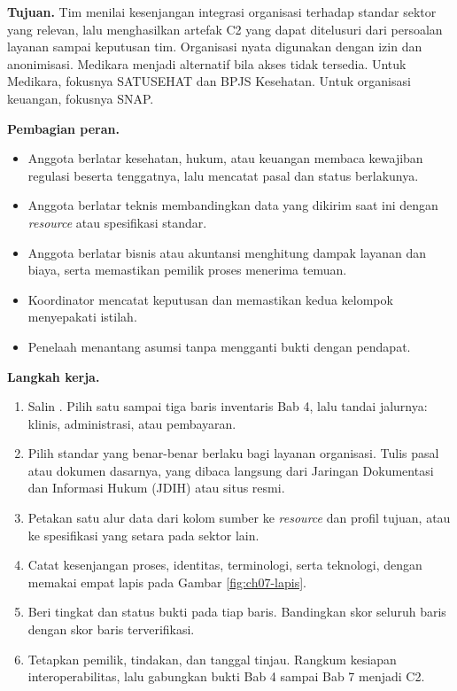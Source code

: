 \textbf{Tujuan.} Tim menilai kesenjangan integrasi organisasi terhadap standar sektor yang relevan, lalu menghasilkan
artefak C2 yang dapat ditelusuri dari persoalan layanan sampai keputusan tim. Organisasi nyata digunakan dengan izin
dan anonimisasi. Medikara menjadi alternatif bila akses tidak tersedia. Untuk Medikara, fokusnya SATUSEHAT dan BPJS
Kesehatan. Untuk organisasi keuangan, fokusnya SNAP.

\textbf{Pembagian peran.}
\begin{itemize}
  \item Anggota berlatar kesehatan, hukum, atau keuangan membaca kewajiban regulasi beserta tenggatnya, lalu mencatat
        pasal dan status berlakunya.
  \item Anggota berlatar teknis membandingkan data yang dikirim saat ini dengan \textit{resource} atau spesifikasi
        standar.
  \item Anggota berlatar bisnis atau akuntansi menghitung dampak layanan dan biaya, serta memastikan pemilik proses
        menerima temuan.
  \item Koordinator mencatat keputusan dan memastikan kedua kelompok menyepakati istilah.
  \item Penelaah menantang asumsi tanpa mengganti bukti dengan pendapat.
\end{itemize}

\textbf{Langkah kerja.}
\begin{enumerate}
  \item Salin . Pilih satu sampai tiga baris
        inventaris Bab 4, lalu tandai jalurnya: klinis, administrasi, atau pembayaran.
  \item Pilih standar yang benar-benar berlaku bagi layanan organisasi. Tulis pasal atau dokumen dasarnya, yang dibaca
        langsung dari Jaringan Dokumentasi dan Informasi Hukum (JDIH) atau situs resmi.
  \item Petakan satu alur data dari kolom sumber ke \textit{resource} dan profil tujuan, atau ke spesifikasi yang
        setara pada sektor lain.
  \item Catat kesenjangan proses, identitas, terminologi, serta teknologi, dengan memakai empat lapis pada Gambar
        \ref{fig:ch07-lapis}.
  \item Beri tingkat dan status bukti pada tiap baris. Bandingkan skor seluruh baris dengan skor baris terverifikasi.
  \item Tetapkan pemilik, tindakan, dan tanggal tinjau. Rangkum kesiapan interoperabilitas, lalu gabungkan bukti Bab 4
        sampai Bab 7 menjadi C2.
\end{enumerate}

